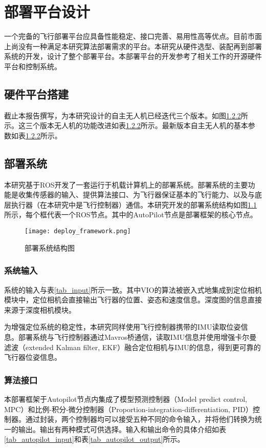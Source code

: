 
\chapter{部署平台设计}
一个完备的飞行部署平台应具备性能稳定、接口完善、易用性高等优点。目前市面上尚没有一种满足本研究算法部署需求的平台。本研究从硬件选型、装配再到部署系统的开发，设计了整个部署平台。本部署平台的开发参考了相关工作的开源硬件平台\cite{zhou2020ego}和控制系统\cite{Faessler18ral}。

\section{硬件平台搭建}

截止本报告撰写，为本研究设计的自主无人机已经迭代三个版本。如图\ref{}所示。这三个版本无人机的功能改进如表\ref{}所示。最新版本自主无人机的基本参数如表\ref{}所示。

\section{部署系统}
本研究基于ROS开发了一套运行于机载计算机上的部署系统。部署系统的主要功能是收集传感器的输入、提供算法接口、为飞行器保证基本的飞行能力、以及与底层执行器（在本研究中是飞行控制器）通信。本研究开发的部署系统结构如图\ref{fig_deploy_framework}所示，每个框代表一个ROS节点。其中的AutoPilot节点是部署框架的核心节点。
\begin{figure}
    \centering
    \texttt{[image: deploy\_framework.png]}
    \caption{部署系统结构图}
    \label{fig_deploy_framework}
\end{figure}

\subsection{系统输入}
系统的输入与表\ref{tab_input}所示一致。其中VIO的算法被嵌入式地集成到定位相机模块中，定位相机会直接输出飞行器的位置、姿态和速度信息。深度图的信息直接来源于深度相机模块。

为增强定位系统的稳定性，本研究同样使用飞行控制器携带的IMU读取位姿信息。部署系统与飞行控制器通过Mavros桥通信\cite{mavros2023}，读取IMU信息并使用增强卡尔曼滤波\cite{kalman1960contributions}\cite{kalman1960new}\cite{kalman1961new}（extended Kalman filter, EKF）融合定位相机与IMU的信息，得到更可靠的飞行器位姿信息。

\subsection{算法接口}
本部署框架于Autopilot节点内集成了模型预测控制器\cite{Falanga2018}（Model predict control, MPC）和比例-积分-微分控制器（Proportion-integration-differentiation, PID）控制器。通过封装，两个控制器均可以接受五种不同的命令输入，并将他们转换为统一的输出。输出有两种模式可供选择。输入和输出命令的具体介绍如表\ref{tab_autopilot_input}和表\ref{tab_autopilot_output}所示。


